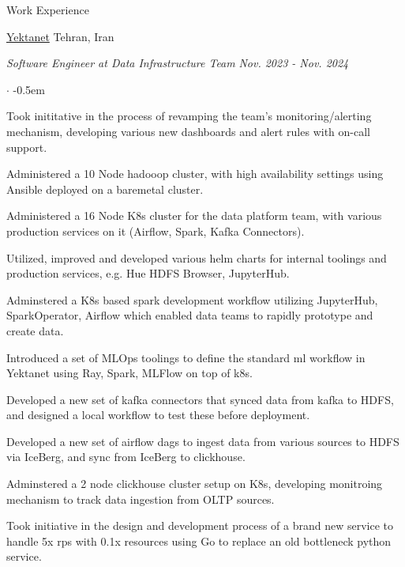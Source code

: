 \documentclass[../professional-cv.tex]{subfiles}
\begin{document}
\begin{rSection}{Work Experience}
	\begin{rWorkSection}
		{\href{https://yektanet.com/}{Yektanet}}
		{Tehran, Iran}

		\vspace{-1em}
		{\em Software Engineer at Data Infrastructure Team} \hfill {\em Nov. 2023 - Nov. 2024} \hspace{10pt}
		\normalfont
		\begin{list}{$\cdot$}{\leftmargin=10pt\normalfont \rightmargin=20pt}
			\itemsep -0.5em
			\item Took inititative in the process of revamping the team's monitoring/alerting mechanism, developing various new dashboards and alert rules with on-call support.
			\item Administered a 10 Node hadooop cluster, with high availability settings using Ansible deployed on a baremetal cluster.
			\item Administered a 16 Node K8s cluster for the data platform team, with various production services on it (Airflow, Spark, Kafka Connectors).
			\item Utilized, improved and developed various helm charts for internal toolings and production services, e.g. Hue HDFS Browser, JupyterHub.
			\item Adminstered a K8s based spark development workflow utilizing JupyterHub, SparkOperator, Airflow which enabled data teams to rapidly prototype and create data.
			\item Introduced a set of MLOps toolings to define the standard ml workflow in Yektanet using Ray, Spark, MLFlow on top of k8s.
			\item Developed a new set of kafka connectors that synced data from kafka to HDFS, and designed a local workflow to test these before deployment.
			\item Developed a new set of airflow dags to ingest data from various sources to HDFS via IceBerg, and sync from IceBerg to clickhouse.
			\item Adminstered a 2 node clickhouse cluster setup on K8s, developing monitroing mechanism to track data ingestion from OLTP sources.
			\item Took initiative in the design and development process of a brand new service to handle 5x rps with 0.1x resources using Go to replace an old bottleneck python service.
		\end{list}
	\end{rWorkSection}


\end{rSection}
\end{document}
